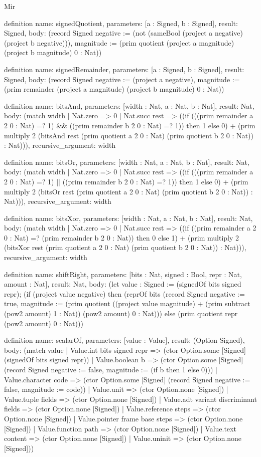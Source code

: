 \begin{lexlean}{Mir}
\begin{semanticmodule}
definition{
  name: signedQuotient,
  parameters: [a : Signed, b : Signed],
  result: Signed,
  body: (record Signed {negative := (not (sameBool (project a negative) (project b negative))), magnitude := (prim quotient (project a magnitude) (project b magnitude) 0 : Nat)})
}

definition{
  name: signedRemainder,
  parameters: [a : Signed, b : Signed],
  result: Signed,
  body: (record Signed {negative := (project a negative), magnitude := (prim remainder (project a magnitude) (project b magnitude) 0 : Nat)})
}

definition{
  name: bitsAnd,
  parameters: [width : Nat, a : Nat, b : Nat],
  result: Nat,
  body: (match width
    | Nat.zero => 0
    | Nat.succ rest => ((if (((prim remainder a 2 0 : Nat) =? 1) && ((prim remainder b 2 0 : Nat) =? 1)) then 1 else 0) + (prim multiply 2 (bitsAnd rest (prim quotient a 2 0 : Nat) (prim quotient b 2 0 : Nat)) : Nat))),
  recursive_argument: width
}

definition{
  name: bitsOr,
  parameters: [width : Nat, a : Nat, b : Nat],
  result: Nat,
  body: (match width
    | Nat.zero => 0
    | Nat.succ rest => ((if (((prim remainder a 2 0 : Nat) =? 1) || ((prim remainder b 2 0 : Nat) =? 1)) then 1 else 0) + (prim multiply 2 (bitsOr rest (prim quotient a 2 0 : Nat) (prim quotient b 2 0 : Nat)) : Nat))),
  recursive_argument: width
}

definition{
  name: bitsXor,
  parameters: [width : Nat, a : Nat, b : Nat],
  result: Nat,
  body: (match width
    | Nat.zero => 0
    | Nat.succ rest => ((if ((prim remainder a 2 0 : Nat) =? (prim remainder b 2 0 : Nat)) then 0 else 1) + (prim multiply 2 (bitsXor rest (prim quotient a 2 0 : Nat) (prim quotient b 2 0 : Nat)) : Nat))),
  recursive_argument: width
}

definition{
  name: shiftRight,
  parameters: [bits : Nat, signed : Bool, repr : Nat, amount : Nat],
  result: Nat,
  body: (let value : Signed := (signedOf bits signed repr); (if (project value negative) then (reprOf bits (record Signed {negative := true, magnitude := (prim quotient ((project value magnitude) + (prim subtract (pow2 amount) 1 : Nat)) (pow2 amount) 0 : Nat)})) else (prim quotient repr (pow2 amount) 0 : Nat)))
}

definition{
  name: scalarOf,
  parameters: [value : Value],
  result: (Option Signed),
  body: (match value
    | Value.int bits signed repr => (ctor Option.some [Signed] (signedOf bits signed repr))
    | Value.boolean b => (ctor Option.some [Signed] (record Signed {negative := false, magnitude := (if b then 1 else 0)}))
    | Value.character code => (ctor Option.some [Signed] (record Signed {negative := false, magnitude := code}))
    | Value.unit => (ctor Option.none [Signed])
    | Value.tuple fields => (ctor Option.none [Signed])
    | Value.adt variant discriminant fields => (ctor Option.none [Signed])
    | Value.reference steps => (ctor Option.none [Signed])
    | Value.pointer frame base steps => (ctor Option.none [Signed])
    | Value.function path => (ctor Option.none [Signed])
    | Value.text content => (ctor Option.none [Signed])
    | Value.uninit => (ctor Option.none [Signed]))
}


\end{semanticmodule}
\end{lexlean}
